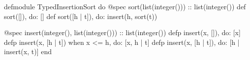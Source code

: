 defmodule TypedInsertionSort do
  @spec sort(list(integer())) :: list(integer())
  def sort([]), do: []
  def sort([h | t]), do: insert(h, sort(t))

  @spec insert(integer(), list(integer())) :: list(integer())
  defp insert(x, []), do: [x]
  defp insert(x, [h | t]) when x <= h, do: [x, h | t]
  defp insert(x, [h | t]), do: [h | insert(x, t)]
end
